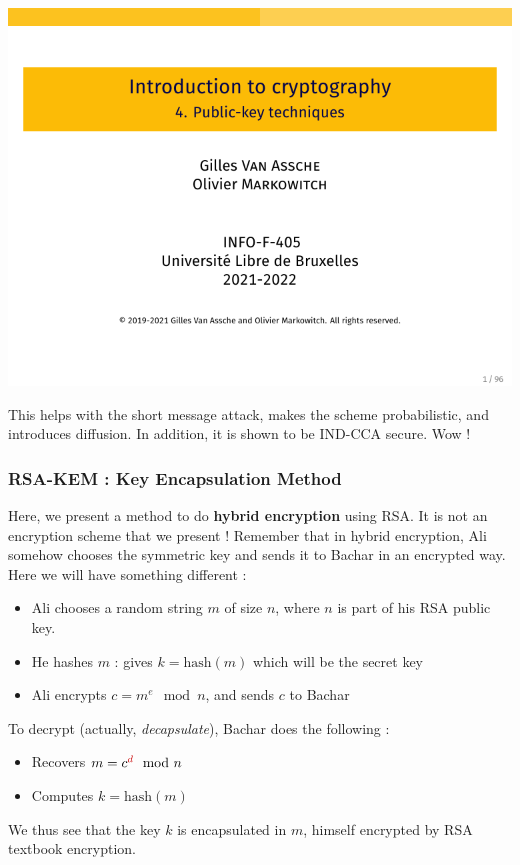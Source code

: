 \documentclass[../Cryptography.tex]{subfiles}
\begin{document}
\begin{center}
    \includegraphics[width=0.8\linewidth, page=47]{Slides/4-Public.pdf}
\end{center}
This helps with the short message attack, makes the scheme probabilistic, and introduces diffusion. In addition, it is shown to be IND-CCA secure. Wow !

\subsubsection{RSA-KEM : Key Encapsulation Method}
Here, we present a method to do \textbf{hybrid encryption} using RSA. It is not an encryption scheme that we present ! Remember that in hybrid encryption, Ali somehow chooses the symmetric key and sends it to Bachar in an encrypted way. Here we will have something different : 
\begin{itemize}
    \item Ali chooses a random string $m$ of size $n$, where $n$ is part of his RSA public key.
    \item He hashes $m$ : gives $k = \mathrm{hash}(m)$ which will be the secret key
    \item Ali encrypts $c = m ^e \mod{n}$, and sends $c$ to Bachar 
\end{itemize}

To decrypt (actually, \textit{decapsulate}), Bachar does the following :
\begin{itemize}
    \item Recovers $m = c^\rouge{d} \mod{n}$
    \item Computes $k = \mathrm{hash}(m)$
\end{itemize}
We thus see that the key $k$ is encapsulated in $m$, himself encrypted by RSA textbook encryption.
\end{document}

